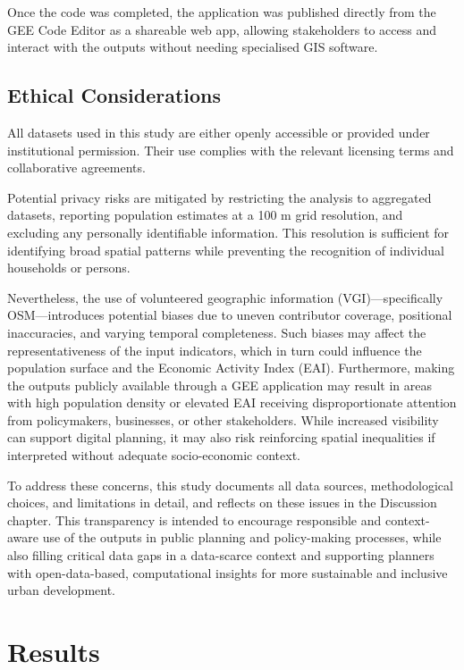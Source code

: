 \documentclass[
  12pt,
  oneside]{book}
\begin{document}
Once the code was completed, the application was published directly from the GEE Code Editor as a shareable web app, allowing stakeholders to access and interact with the outputs without needing specialised GIS software.

\section{Ethical Considerations}\label{ethical-considerations}

All datasets used in this study are either openly accessible or provided under institutional permission. Their use complies with the relevant licensing terms and collaborative agreements.

Potential privacy risks are mitigated by restricting the analysis to aggregated datasets, reporting population estimates at a 100 m grid resolution, and excluding any personally identifiable information. This resolution is sufficient for identifying broad spatial patterns while preventing the recognition of individual households or persons.

Nevertheless, the use of volunteered geographic information (VGI)---specifically OSM---introduces potential biases due to uneven contributor coverage, positional inaccuracies, and varying temporal completeness. Such biases may affect the representativeness of the input indicators, which in turn could influence the population surface and the Economic Activity Index (EAI). Furthermore, making the outputs publicly available through a GEE application may result in areas with high population density or elevated EAI receiving disproportionate attention from policymakers, businesses, or other stakeholders. While increased visibility can support digital planning, it may also risk reinforcing spatial inequalities if interpreted without adequate socio-economic context.

To address these concerns, this study documents all data sources, methodological choices, and limitations in detail, and reflects on these issues in the Discussion chapter. This transparency is intended to encourage responsible and context-aware use of the outputs in public planning and policy-making processes, while also filling critical data gaps in a data-scarce context and supporting planners with open-data-based, computational insights for more sustainable and inclusive urban development.

\chapter{Results}\label{results}
\end{document}
